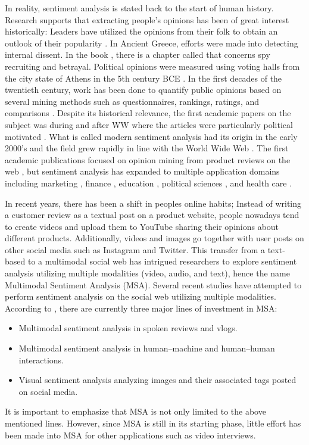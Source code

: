 In reality, sentiment analysis is stated back to the start of human history. Research supports that extracting people's opinions has been of great interest historically: Leaders have utilized the opinions from their folk to obtain an outlook of their popularity \cite{SA-history-MANTYLA201816}. In Ancient Greece, efforts were made into detecting internal dissent. In the book , there is a chapter called  that concerns spy recruiting and betrayal. Political opinions were measured using voting halls from the city state of Athens in the 5th century BCE \cite{ATHEN-voting-thorley2012athenian}.  In the first decades of the twentieth century, work has been done to quantify public opinions based on several mining methods such as questionnaires, rankings, ratings, and comparisons \cite{mining-methods-droba1931methods}. Despite its historical relevance, the first academic papers on the subject was during and after WW\MakeUppercase{} where the articles were particularly political motivated \cite{SA-history-MANTYLA201816}. What is called modern sentiment analysis had its origin in the early 2000's and the field grew rapidly in line with the World Wide Web \cite{deep-learning-WIRE}. The first academic publications focused on opinion mining from product reviews on the web \cite{describe-polarity-dave2003mining}, but sentiment analysis has expanded to multiple application domains including marketing \cite{marketing-sa-rambocas2018online}, finance \cite{stock_price1}, education \cite{education_domain}, political sciences \cite{political-science-sa-rice2021corpus}, and health care \cite{healthcare-sa-gohil2018sentiment}. 

In recent years, there has been a shift in peoples online habits; Instead of writing a customer review as a textual post on a product website, people nowadays tend to create videos and upload them to YouTube sharing their opinions about different products. Additionally, videos and images go together with user posts on other social media such as Instagram and Twitter. This transfer from a text-based to a multimodal social web has intrigued researchers to explore sentiment analysis utilizing multiple modalities (video, audio, and text), hence the name Multimodal Sentiment Analysis (MSA). Several recent studies have attempted to perform sentiment analysis on the social web utilizing multiple modalities. According to \cite{MSA_review1_SOLEYMANI20173}, there are currently three major lines of investment in MSA: 
%
\begin{itemize}
    \item Multimodal sentiment analysis in spoken reviews and vlogs.
    \item Multimodal sentiment analysis in human–machine and human–human interactions.
    \item Visual sentiment analysis analyzing images and their associated tags posted on social media.
\end{itemize}
%
It is important to emphasize that MSA is not only limited to the above mentioned lines. However, since MSA is still in its starting phase, little effort has been made into MSA for other applications such as video interviews. \\

